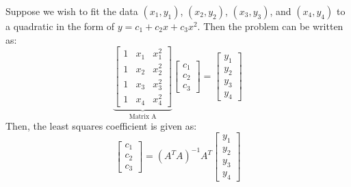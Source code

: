 \documentclass{article}
\begin{document}
\begin{idea}
    Suppose we wish to fit the data $(x_1,y_1)$, $(x_2,y_2)$, $(x_3,y_3)$, and $(x_4,y_4)$ to a quadratic in the form of $y=c_1+c_2x+c_3x^2$. Then the problem can be written as:
    \begin{equation}
        \underbrace{\begin{bmatrix}
            1 & x_1 & x_1^2 \\ 
            1 & x_2 & x_2^2 \\ 
            1 & x_3 & x_3^2 \\ 
            1 & x_4 & x_4^2
        \end{bmatrix}}_\text{Matrix A}
        \begin{bmatrix}
            c_1\\c_2\\c_3
        \end{bmatrix}
        =\begin{bmatrix}
            y_1\\y_2\\y_3\\y_4
        \end{bmatrix}
        \label{eq:}
    \end{equation}
    Then, the least squares coefficient is given as:
    \begin{equation}
        \begin{bmatrix}
            c_1\\c_2\\c_3
        \end{bmatrix}
        = 
        \left(A^TA\right)^{-1}A^T\begin{bmatrix}
            y_1 \\ y_2 \\ y_3 \\ y_4
        \end{bmatrix}
        \label{eq:}
    \end{equation}
\end{idea}
\end{document}
